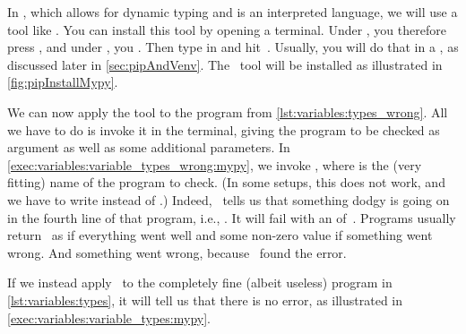 In \python, which allows for dynamic typing and is an interpreted language, we will use a tool like \mypy{}.
You can install this tool by opening a terminal.
Under \ubuntu, you therefore press \ubuntuTerminal, and under \microsoftWindows, you \windowsTerminal.
Then type in  and hit~\keys{\return}.
Usually, you will do that in a , as discussed later in \cref{sec:pipAndVenv}.
The \mypy\ tool will be installed as illustrated in \cref{fig:pipInstallMypy}.%
%
\begin{sloppypar}%
We can now apply the tool to the program  from \cref{lst:variables:types_wrong}.
All we have to do is invoke it in the terminal, giving the program to be checked as argument as well as some additional parameters.
In \cref{exec:variables:variable_types_wrong:mypy}, we invoke , where  is the (very fitting) name of the program to check.
(In some setups, this does not work, and we have to write  instead of  .)
Indeed, \mypy\ tells us that something dodgy is going on in the fourth line of that program, i.e., .
It will fail with an  of~.
Programs usually return~ as  if everything went well and some non-zero value if something went wrong.
And something went wrong, because \mypy\ found the error.%
\end{sloppypar}%
%
%
%
If we instead apply \mypy\ to the completely fine (albeit useless) program  in \cref{lst:variables:types}, it will tell us that there is no error, as illustrated in \cref{exec:variables:variable_types:mypy}.
